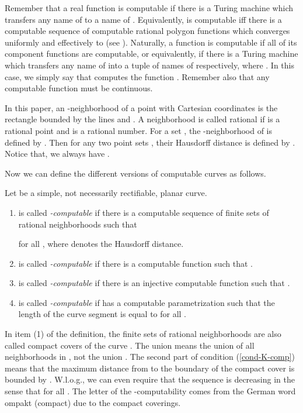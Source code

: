 \documentclass{LMCS}
\theoremstyle{plain}
\begin{document}
Remember that a real function  is computable if there is a Turing machine  which transfers any name of  to a name of .  Equivalently,  is computable iff there is a computable sequence  of computable rational polygon functions which converges uniformly and effectively to  (see \cite{PR89}). Naturally, a function  is computable if all of its component functions are computable, or equivalently, if there is a Turing machine  which transfers any name of  into a tuple  of names of  respectively, where . In this case, we simply say that  computes the function . Remember also that any computable function must be continuous.

In this paper, an -neighborhood  of a point  with Cartesian coordinates  is the rectangle bounded by the lines  and . A neighborhood  is called rational if  is a rational point and  is a rational number. For a set , the -neighborhood of  is defined by . Then for any two point sets , their Hausdorff distance is defined by . Notice that, we  always have .

Now we can define the different versions of computable curves as follows.

\begin{defi}\label{Def-comp-curve}
Let  be a simple, not necessarily rectifiable, planar curve.
\begin{enumerate}[(1)]
 \item  is called {\em -computable} if there is a computable sequence  of finite sets of rational neighborhoods such that

for all , where  denotes the Hausdorff distance.

\item  is called {\em -computable} if there is a computable function  such that .

\item  is called {\em -computable} if there is an injective computable function  such that .

\item  is called {\em -computable} if  has a computable parametrization  such that the length of the curve segment  is equal to  for all .
\end{enumerate}
\end{defi}

\noindent In item (1) of the definition, the finite sets  of rational neighborhoods are also called compact covers of the curve . The union  means the union of all neighborhoods in , not the union .   The second part of condition (\ref{cond-K-comp}) means that the maximum distance from  to the boundary of the compact cover  is bounded by . W.l.o.g., we can even require that the sequence  is decreasing in the sense that  for all .  The letter  of the -computability comes from the German word ompakt (compact) due to the compact coverings.
\end{document}
